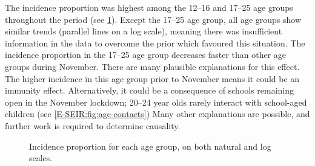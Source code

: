 \documentclass[thesis.tex]{subfiles}
\begin{document}
The incidence proportion was highest among the 12--16 and 17--25 age groups throughout the period (see \cref{transmission:fig:backcalc-ages}).
Except the 17--25 age group, all age groups show similar trends (\ie parallel lines on a log scale), meaning there was insufficient information in the data to overcome the prior which favoured this situation.
The incidence proportion in the 17--25 age group decreases faster than other age groups during November.
There are many plausible explanations for this effect.
The higher incidence in this age group prior to November means it could be an immunity effect.
Alternatively, it could be a consequence of schools remaining open in the November lockdown; 20--24 year olds rarely interact with school-aged children (see \cref{E-SEIR:fig:age-contacts})
Many other explanations are possible, and further work is required to determine causality.
\begin{figure}
    \caption[Incidence estimated using backcalculation by age group]{%
        Incidence proportion for each age group, on both natural and log scales.
    }
    \label{transmission:fig:backcalc-ages}
\end{figure}
\end{document}
